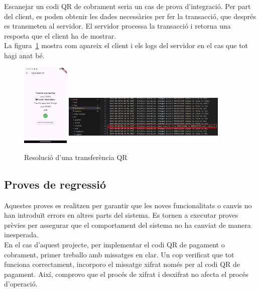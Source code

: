\documentclass[a4paper,12pt,twoside]{ThesisStyle}
\begin{document}
Escanejar un codi QR de cobrament seria un cas de prova d'integració. Per part del client, es poden obtenir les dades necessàries per fer la transacció, que després es transmeten al servidor. El servidor processa la transacció i retorna una resposta que el client ha de mostrar.\\

La figura~\ref{fig: Resolució d'una transferència QR} mostra com apareix el client i els logs del servidor en el cas que tot hagi anat bé.

\begin{figure}[h]   
    \centering
    \includegraphics[width=0.2\textwidth]{imatges/capturedQR.png}
    \includegraphics[width=0.7\textwidth]{imatges/prova2.png}
    \caption{Resolució d'una transferència QR}
    \label{fig: Resolució d'una transferència QR}
\end{figure}


\subsection{Proves de regressió}
\label{subsec: Proves de regressió}

Aquestes proves es realitzen per garantir que les noves funcionalitats o canvis no han introduït errors en altres parts del sistema. Es tornen a executar proves prèvies per assegurar que el comportament del sistema no ha canviat de manera inesperada.\\

En el cas d'aquest projecte, per implementar el codi QR de pagament o cobrament, primer treballo amb missatges en clar. Un cop verificat que tot funciona correctament, incorporo el missatge xifrat només per al codi QR de pagament. Així, comprovo que el procés de xifrat i desxifrat no afecta el procés d'operació.\\
\end{document}
